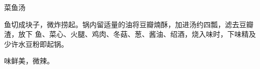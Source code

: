 \begin{recipe}{菜鱼汤}

\ingredients


\preparation

鱼切成块子，微炸捞起。锅内留适量的油将豆瓣煵酥，加进汤约四瓢，滤去豆瓣渣，放下
鱼、菜心、火腿、鸡肉、冬菇、葱、酱油、绍酒，烧入味时，下味精及少许水豆粉即起锅。

\features

味鲜美，微辣。

\end{recipe}

